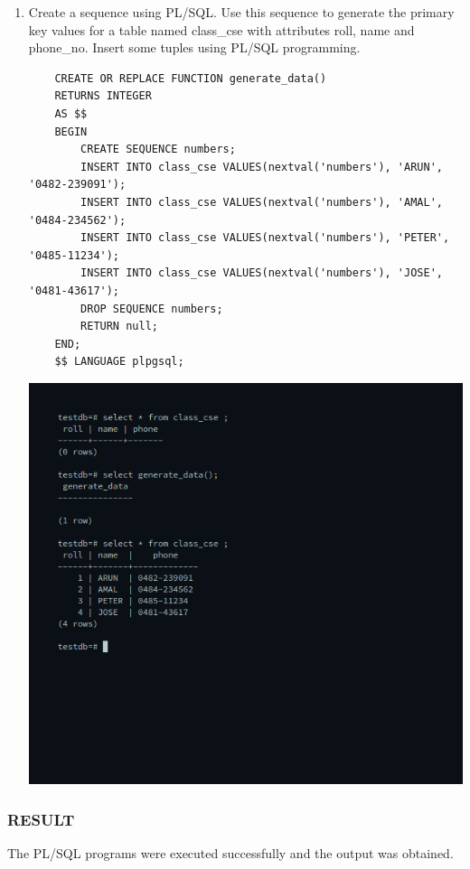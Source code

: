 \documentclass[10pt,a4paper,titlepage]{report}
\begin{document}
{\begin{enumerate}
	\item Create a sequence using PL/SQL. Use this sequence to generate the primary key values for a table named class\_cse with attributes roll, name and phone\_no. Insert some tuples using PL/SQL programming.\newline
	\begin{verbatim}
	CREATE OR REPLACE FUNCTION generate_data()
	RETURNS INTEGER
	AS $$
	BEGIN
		CREATE SEQUENCE numbers;
		INSERT INTO class_cse VALUES(nextval('numbers'), 'ARUN', '0482-239091');
		INSERT INTO class_cse VALUES(nextval('numbers'), 'AMAL', '0484-234562');
		INSERT INTO class_cse VALUES(nextval('numbers'), 'PETER', '0485-11234');
		INSERT INTO class_cse VALUES(nextval('numbers'), 'JOSE', '0481-43617');
		DROP SEQUENCE numbers;
		RETURN null;
	END;
	$$ LANGUAGE plpgsql;
	\end{verbatim}
	\includegraphics[width=\linewidth]{../Images/Plsql/6.png}

\end{enumerate}

\subsubsection{RESULT}
The PL/SQL programs were executed successfully and the output was obtained.

}
\end{document}
